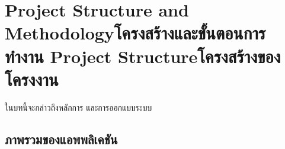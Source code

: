 \chapter{\ifproject%
    \ifenglish Project Structure and Methodology\else โครงสร้างและขั้นตอนการทำงาน\fi
  \else%
    \ifenglish Project Structure\else โครงสร้างของโครงงาน\fi
  \fi
 }

ในบทนี้จะกล่าวถึงหลักการ และการออกแบบระบบ

\makeatletter


\makeatother

\section{ภาพรวมของแอพพลิเคชัน}


